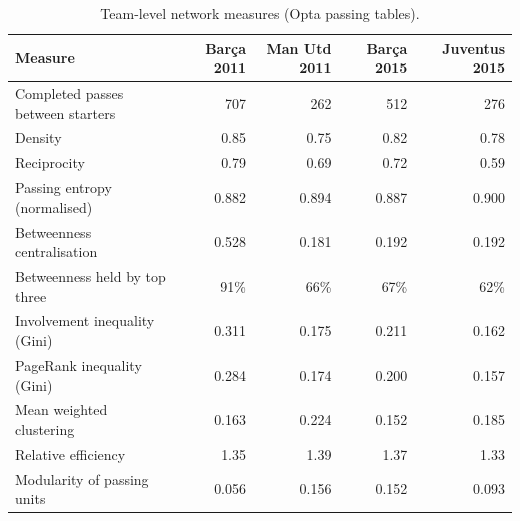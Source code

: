 \begin{table}[t]
\centering\small
\caption{Team-level network measures (Opta passing tables).}
\label{tab:global}
\begin{tabular}{lrrrr}
\toprule
Measure & Barça 2011 & Man Utd 2011 & Barça 2015 & Juventus 2015 \\
\midrule
Completed passes between starters & 707 & 262 & 512 & 276 \\
Density & 0.85 & 0.75 & 0.82 & 0.78 \\
Reciprocity & 0.79 & 0.69 & 0.72 & 0.59 \\
Passing entropy (normalised) & 0.882 & 0.894 & 0.887 & 0.900 \\
Betweenness centralisation & 0.528 & 0.181 & 0.192 & 0.192 \\
Betweenness held by top three & 91\% & 66\% & 67\% & 62\% \\
Involvement inequality (Gini) & 0.311 & 0.175 & 0.211 & 0.162 \\
PageRank inequality (Gini) & 0.284 & 0.174 & 0.200 & 0.157 \\
Mean weighted clustering & 0.163 & 0.224 & 0.152 & 0.185 \\
Relative efficiency & 1.35 & 1.39 & 1.37 & 1.33 \\
Modularity of passing units & 0.056 & 0.156 & 0.152 & 0.093 \\
\bottomrule
\end{tabular}
\end{table}
